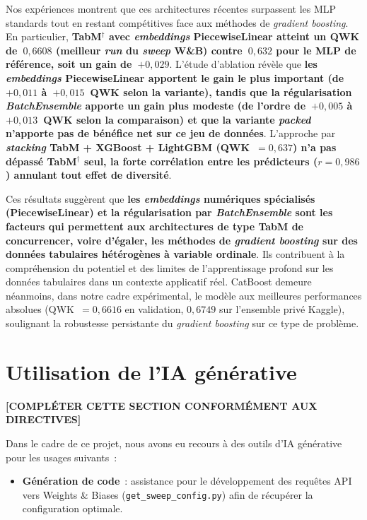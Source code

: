 \documentclass[conference]{IEEEtran}
\begin{document}
Nos expériences montrent que ces architectures récentes surpassent les MLP standards tout en restant compétitives face aux méthodes de \textit{gradient boosting}. En particulier, \textbf{TabM$^{\dagger}$ avec \textit{embeddings} PiecewiseLinear atteint un QWK de~$0{,}6608$ (meilleur \textit{run} du \textit{sweep} W\&B) contre~$0{,}632$ pour le MLP de référence, soit un gain de~$+0{,}029$}. L'étude d'ablation révèle que \textbf{les \textit{embeddings} PiecewiseLinear apportent le gain le plus important (de~$+0{,}011$ à~$+0{,}015$~QWK selon la variante), tandis que la régularisation \textit{BatchEnsemble} apporte un gain plus modeste (de l'ordre de~$+0{,}005$ à~$+0{,}013$~QWK selon la comparaison) et que la variante \textit{packed} n'apporte pas de bénéfice net sur ce jeu de données}. L'approche par \textbf{\textit{stacking} TabM + XGBoost + LightGBM (QWK~$=0{,}637$) n'a pas dépassé TabM$^{\dagger}$ seul, la forte corrélation entre les prédicteurs ($r=0{,}986$) annulant tout effet de diversité}.

Ces résultats suggèrent que \textbf{les \textit{embeddings} numériques spécialisés (PiecewiseLinear) et la régularisation par \textit{BatchEnsemble} sont les facteurs qui permettent aux architectures de type TabM de concurrencer, voire d'égaler, les méthodes de \textit{gradient boosting} sur des données tabulaires hétérogènes à variable ordinale}. Ils contribuent à la compréhension du potentiel et des limites de l'apprentissage profond sur les données tabulaires dans un contexte applicatif réel. CatBoost demeure néanmoins, dans notre cadre expérimental, le modèle aux meilleures performances absolues (QWK~$=0{,}6616$ en validation, $0{,}6749$ sur l'ensemble privé Kaggle), soulignant la robustesse persistante du \textit{gradient boosting} sur ce type de problème.

\section{Utilisation de l'IA générative}

\textbf{[COMPLÉTER CETTE SECTION CONFORMÉMENT AUX DIRECTIVES]}

Dans le cadre de ce projet, nous avons eu recours à des outils d'IA générative pour les usages suivants~:
\begin{itemize}
  \item \textbf{Génération de code}~: assistance pour le développement des requêtes API vers Weights \& Biases (\texttt{get\_sweep\_config.py}) afin de récupérer la configuration optimale.
\end{itemize}




\end{document}
